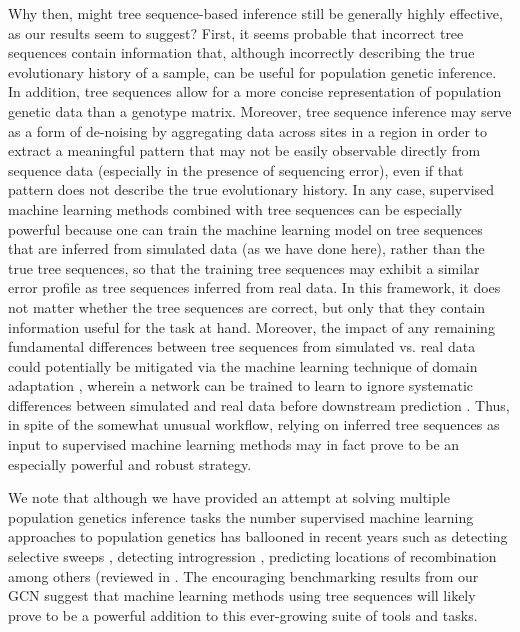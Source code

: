 Why then, might tree sequence-based inference still be generally highly effective, as our results seem to suggest? First, it seems probable that incorrect tree sequences contain information that, although incorrectly describing the true evolutionary history of a sample, can be useful for population genetic inference. In addition, tree sequences allow for a more concise representation of population genetic data than a genotype matrix. Moreover, tree sequence inference may serve as a form of de-noising by aggregating data across sites in a region in order to extract a meaningful pattern that may not be easily observable directly from sequence data (especially in the presence of sequencing error), even if that pattern does not describe the true evolutionary history. In any case, supervised machine learning methods combined with tree sequences can be especially powerful because one can train the machine learning model on tree sequences that are inferred from simulated data (as we have done here), rather than the true tree sequences, so that the training tree sequences may exhibit a similar error profile as tree sequences inferred from real data. In this framework, it does not matter whether the tree sequences are correct, but only that they contain information useful for the task at hand. Moreover, the impact of any remaining fundamental differences between tree sequences from simulated vs. real data could potentially be mitigated via the machine learning technique of domain adaptation \cite{ganinUnsupervisedDomainAdaptation2015}, wherein a network can be trained to learn to ignore systematic differences between simulated and real data before downstream prediction \cite{moDomainadaptiveNeuralNetworks2023a}. Thus, in spite of the somewhat unusual workflow, relying on inferred tree sequences as input to supervised machine learning methods may in fact prove to be an especially powerful and robust strategy.

We note that although we have provided an attempt at solving multiple population genetics inference tasks the number supervised machine learning approaches to population genetics has ballooned in recent years such as detecting selective sweeps \cite{hejaseDeepLearningApproachInference2022,kernDiploSHICUpdated2018,whitehouseTimesweeperAccuratelyIdentifying2023}, detecting introgression \cite{gowerDetectingAdaptiveIntrogression2021,rayIntroUNETIdentifyingIntrogressed2023,schriderSupervisedMachineLearning2018a}, predicting locations of recombination \cite{adrionPredictingLandscapeRecombination2020} among others (reviewed in \cite{flagelUnreasonableEffectivenessConvolutional2019,korfmannDeepLearningPopulation2023a,schriderSupervisedMachineLearning2018}. The encouraging benchmarking results from our GCN suggest that machine learning methods using tree sequences will likely prove to be a powerful addition to this ever-growing suite of tools and tasks. 

